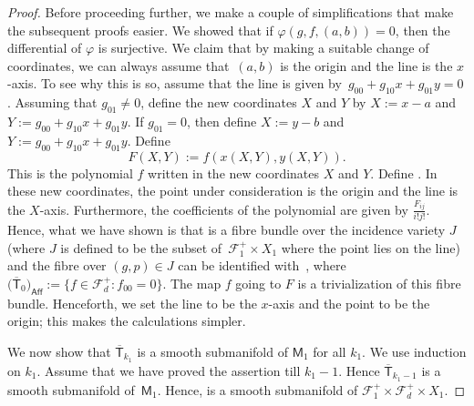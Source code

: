 \documentclass[11pt]{article}
\numberwithin{equation}{section}
\begin{document}
\begin{proof}
Before proceeding further, we make a couple of simplifications that make the
subsequent proofs easier.
We showed that if $\varphi(g, f, (a, b)) = 0$, then the
differential of $\varphi$ is surjective. We claim that by making a suitable change of
coordinates, we can always assume that~$(a,b)$ is the origin and the line is the $x$-axis.
To see why this is so,
assume that the line is given by~${g_{00} + g_{10}x + g_{01}y = 0}$.
Assuming that $g_{01}\neq 0$, define the new coordinates $X$
and $Y$ by $X := x-a$ and $Y := g_{00} + g_{10}x + g_{01}y$.
If $g_{01} =0$, then define $X:= y-b$ and $Y:= g_{00} + g_{10}x + g_{01}y$.
Define
\[F(X,Y):= f(x(X,Y), y(X,Y)).\]
This is the polynomial $f$
written in the new coordinates $X$ and $Y$. Define
.
In these new coordinates, the point under consideration is the origin
and the line is the $X$-axis. Furthermore, the coefficients of the polynomial
are given by $\frac{F_{ij}}{i!j!}$.
Hence, what we have shown is that
 is a fibre bundle over the incidence variety
$J$ (where $J$ is defined to be the subset of~${\mathcal{F}_1^{+}\times X_1}$ where the point lies on the line)
and the fibre over $(g, p) \in J$ can be identified with~, where
$\big(\overline{\mathsf{T}}_0\big)_{\mathsf{Aff}} := \{ f \in \mathcal{F}_d^+\colon f_{00}=0 \}$.
The map $f$ going to $F$ is a trivialization of this fibre bundle.
Henceforth, we set the line to be the $x$-axis and the point to be the origin; this makes the
calculations simpler.

We now show that $\overline{\mathsf{T}}_{k_1}$ is a smooth
submanifold of $\mathsf{M}_1$ for all $k_1$. We use induction on $k_1$.
Assume that we have proved the assertion till $k_1-1$. Hence
$\overline{\mathsf{T}}_{k_1-1}$ is a smooth
submanifold of~$\mathsf{M}_1$. Hence,
 is a smooth submanifold of
$\mathcal{F}_1^{+} \times \mathcal{F}_d^{+} \times X_1$.


\end{proof}
\end{document}
